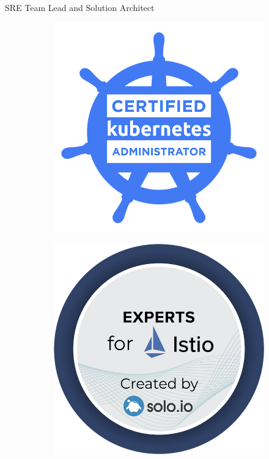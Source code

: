 \documentclass[]{friggeri-cv}
\begin{document}
      {SRE Team Lead and Solution Architect}


\begin{figure}[h]
  \centering
  \begin{subfigure}[b]{0.1\linewidth}
    \includegraphics[width=\linewidth]{img/cka.png}
  \end{subfigure}
  \begin{subfigure}[b]{0.1\linewidth}
    \includegraphics[width=\linewidth]{img/istio-expert.png}

\end{subfigure}
\end{figure}
\end{document}

